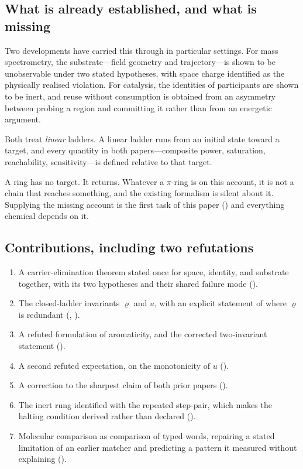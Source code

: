 \documentclass[11pt,a4paper]{article}
\theoremstyle{clthm}
\theoremstyle{definition}
\theoremstyle{remark}
\newcommand{\circu}{\varrho}
\newcommand{\unif}{u}
\begin{document}
\subsection{What is already established, and what is missing}

Two developments have carried this through in particular settings. For
mass spectrometry, the substrate---field geometry and trajectory---is
shown to be unobservable under two stated hypotheses, with space charge
identified as the physically realised violation. For catalysis, the
identities of participants are shown to be inert, and reuse without
consumption is obtained from an asymmetry between probing a region and
committing it rather than from an energetic argument.

Both treat \emph{linear} ladders. A linear ladder runs from an initial
state toward a target, and every quantity in both papers---composite
power, saturation, reachability, sensitivity---is defined relative to that
target.

A ring has no target. It returns. Whatever a $\pi$-ring is on this
account, it is not a chain that reaches something, and the existing
formalism is silent about it. Supplying the missing account is the first
task of this paper () and everything chemical depends on
it.

\subsection{Contributions, including two refutations}

\begin{enumerate}[label=(\roman*),leftmargin=2.4em,itemsep=2pt]
\item A carrier-elimination theorem stated once for space, identity, and
substrate together, with its two hypotheses and their shared failure mode
().
\item The closed-ladder invariants $\circu$ and $\unif$, with an explicit
statement of where $\circu$ is redundant (,
).
\item A refuted formulation of aromaticity, and the corrected two-invariant
statement ().
\item A second refuted expectation, on the monotonicity of $\unif$
().
\item A correction to the sharpest claim of both prior papers
().
\item The inert rung identified with the repeated step-pair, which makes
the halting condition derived rather than declared
().
\item Molecular comparison as comparison of typed words, repairing a
stated limitation of an earlier matcher and predicting a pattern it
measured without explaining ().
\end{enumerate}
\end{document}
